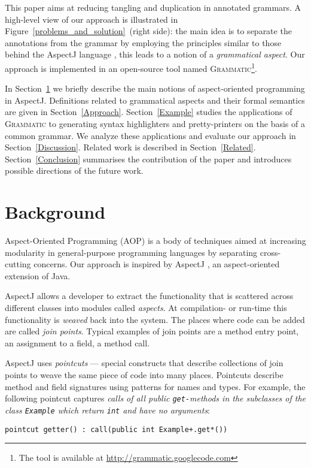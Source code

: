 \documentclass{IOS-Book-Article}     %
\newcommand{\figref}[1]{Figure~\ref{#1}}
\newcommand{\secref}[1]{Section~\ref{#1}}
\newcommand{\tool}[1]{\textsc{#1}}
\newcommand{\Grammatic}[0]{\tool{Grammatic}}
\begin{document}
This paper aims at reducing tangling and duplication in annotated grammars. 
A high-level view of our approach is illustrated in \figref{problems_and_solution}~(right side): the main idea is to separate the annotations from the grammar by employing the principles similar to those behind the AspectJ language \cite{AspectJ}, this leads to a notion of a \emph{grammatical aspect}. Our approach is implemented in an open-source tool named \Grammatic{}\footnote{The tool is available at \url{http://grammatic.googlecode.com}}. 

In \secref{Background} we briefly describe the main notions of aspect-oriented programming in AspectJ. 
Definitions related to grammatical aspects and their formal semantics are given in \secref{Approach}. 
\secref{Example} studies the applications of \Grammatic{} to generating syntax highlighters and pretty-printers on the basis of a common grammar. We analyze these applications and evaluate our approach in \secref{Discussion}. Related work is described in \secref{Related}. \secref{Conclusion} summarises the contribution of the paper and introduces possible directions of the future work.

\section{Background}\label{Background}
Aspect-Oriented Programming (AOP) is a body of techniques aimed at increasing modularity in general-purpose programming languages by separating cross-cutting concerns. Our approach is inspired by AspectJ \cite{AspectJ}, an aspect-oriented extension of Java. 

AspectJ allows a developer to extract the functionality that is scattered across different classes into modules called \emph{aspects}. At compilation- or run-time this functionality is \emph{weaved} back into the system. The places where code can be added are called \emph{join points}. Typical examples of join points are a method entry point, an assignment to a field, a method call. 

AspectJ uses \emph{pointcuts} --- special constructs that describe collections of join points to weave the same piece of code into many places. Pointcuts describe method and field signatures using patterns for names and types. For example, the following pointcut captures \textit{calls of all public \texttt{get-}methods in the subclasses of the class \texttt{Example} which return \texttt{int} and have no arguments}:
\begin{lstlisting}[language={[AspectJ]Java}]
    pointcut getter() : call(public int Example+.get*())
\end{lstlisting}
\end{document}

